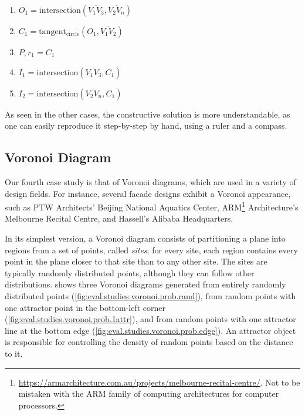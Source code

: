 \begin{enumerate}
  \item $O_1 = \mathrm{intersection}\left(\overline{V_1 V_3}, \overline{V_2
  V_n}\right)$
  \item $C_1 = \mathrm{tangent_{circle}}\left(O_1, \overline{V_1 V_2}\right)$
  \item $P,r_1 = C_1$
  \item $I_1 = \mathrm{intersection}\left(\overline{V_1 V_3}, C_1\right)$
  \item $I_2 = \mathrm{intersection}\left(\overline{V_2 V_n}, C_1\right)$
\end{enumerate}

As seen in the other cases, the constructive solution is more understandable, as
one can easily reproduce it step-by-step by hand, using a ruler and a compass.

\subsection{Voronoi Diagram}%
\label{sec:eval.studies.voronoi}

Our fourth case study is that of Voronoi diagrams, which are used in a variety
of design fields.  For instance, several facade designs exhibit a Voronoi
appearance, such as PTW Architects' Beijing National Aquatics Center,
ARM\footnote{\url{https://armarchitecture.com.au/projects/melbourne-recital-centre/}.
Not to be mistaken with the ARM family of computing architectures for computer
processors.} Architecture's Melbourne Recital Centre, and Hassell's Alibaba
Headquarters.

In its simplest version, a Voronoi diagram consists of partitioning a plane into
regions from a set of points, called \textit{sites}; for every site, each region
contains every point in the plane closer to that site than to any other site.
The sites are typically randomly distributed points, although they can follow
other distributions.   shows three Voronoi
diagrams generated from entirely randomly distributed points
(\cref{fig:eval.studies.voronoi.prob.rand}), from random points with one
attractor point in the bottom-left corner
(\cref{fig:eval.studies.voronoi.prob.1attr}), and from random points with one
attractor line at the bottom edge (\cref{fig:eval.studies.voronoi.prob.edge}).
An attractor object is responsible for controlling the density of random points
based on the distance to it.

